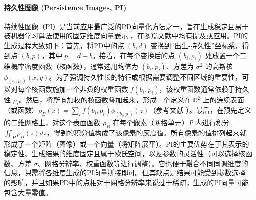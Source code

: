             \paragraph{持久性图像 (Persistence Images, PI)}
                \label{sec:feat_pi}
                持续性图像（PI）\cite{pun2022persistent}是当前应用最广泛的PD向量化方法之一，旨在生成稳定且易于被机器学习算法使用的固定维度向量表示 ，在多篇文献中均有提及或应用。PI的生成过程大致如下：首先，将PD中的点 $(b, d)$ 变换到“出生-持久性”坐标系，得到点 $(b, p)$，其中 $p = d-b$。接着，在每个变换后的点 $(b_i, p_i)$ 处放置一个二维概率密度函数（核函数），通常选用均值为 $(b_i, p_i)$、方差为 $\sigma^2$ 的高斯核 $\phi_{(b_i, p_i)}(x, y)$。为了强调持久性长的特征或根据需要调整不同区域的重要性，可以对每个核函数施加一个非负的权重函数 $f(b_i, p_i)$，该权重函数通常依赖于持久性 $p_i$。然后，将所有加权的核函数叠加起来，形成一个定义在 $\mathbb{R}^2$ 上的连续表面（或函数）$\rho_{B}(z) = \sum_i f(b_i, p_i) \phi_{(b_i, p_i)}(z)$（参考文献 ）。最后，在预先定义的二维网格上，对这个表面函数 $\rho_B$ 在每个像素（网格单元）$P$ 内进行积分 $\iint_P \rho_B(z) dz$，得到的积分值构成了该像素的灰度值。所有像素的值排列起来就形成了一个矩阵（图像）或一个向量（将矩阵展平）。PI的主要优势在于其表示的稳定性、生成结果的维度固定且属于欧氏空间，以及参数的灵活性（可以选择核函数、方差 $\sigma$、网格分辨率、权重函数等进行调整）。它也便于融合不同同调维度的信息，只需将各维度生成的PI向量拼接即可。但其缺点是结果可能受到参数选择的影响，并且如果PD中的点相对于网格分辨率来说过于稀疏，生成的PI向量可能包含大量零值。

